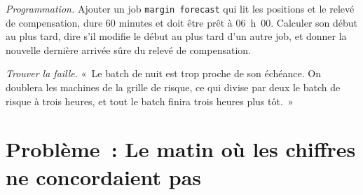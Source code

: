 \begin{exercise}[$\star\star\star$]\label{exo:pl:the-platform-map:7}
\emph{Programmation.} Ajouter un job \texttt{margin forecast} qui lit les positions et le relevé de compensation, dure 60 minutes et doit
être prêt à 06~h~00. Calculer son début au plus tard, dire s'il modifie le début au plus tard d'un autre job, et
donner la nouvelle dernière arrivée sûre du relevé de compensation.
\end{exercise}

\begin{exercise}[$\star\star\star$]\label{exo:pl:the-platform-map:8}
\emph{Trouver la faille.} «~Le batch de nuit est trop proche de son échéance. On doublera les machines de la grille de risque, ce qui divise
par deux le batch de risque à trois heures, et tout le batch finira trois heures plus tôt.~»
\end{exercise}

\section{Problème~: Le matin où les chiffres ne concordaient pas}

